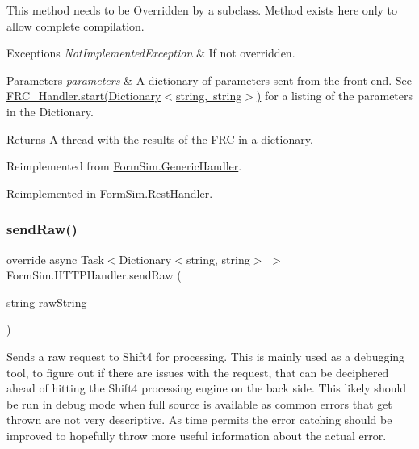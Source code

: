 This method needs to be Overridden by a subclass. Method exists here only to allow complete compilation. 


\begin{DoxyExceptions}{Exceptions}
{\em Not\+Implemented\+Exception} & If not overridden.\\
\hline
\end{DoxyExceptions}

\begin{DoxyParams}{Parameters}
{\em parameters} & A dictionary of parameters sent from the front end. See \mbox{\hyperlink{interface_form_sim_1_1_f_r_c___handler_a2a2a8a776e774e5f8b5e2b7e623a26a6}{F\+R\+C\+\_\+\+Handler.\+start(\+Dictionary$<$string, string$>$)}} for a listing of the parameters in the Dictionary.\\
\hline
\end{DoxyParams}
\begin{DoxyReturn}{Returns}
A thread with the results of the F\+RC in a dictionary.
\end{DoxyReturn}


Reimplemented from \mbox{\hyperlink{class_form_sim_1_1_generic_handler_a824697e5c22a4f1cf8ce4e512b6954ad}{Form\+Sim.\+Generic\+Handler}}.



Reimplemented in \mbox{\hyperlink{class_form_sim_1_1_rest_handler_aaba7a1239d5e4e2eb63e0f24f76341d1}{Form\+Sim.\+Rest\+Handler}}.

\mbox{\label{class_form_sim_1_1_h_t_t_p_handler_a31006e646afd7cb331784dce27760d5b}} 
\subsubsection{\texorpdfstring{send\+Raw()}{sendRaw()}}
{\footnotesize\ttfamily override async Task$<$Dictionary$<$string, string$>$ $>$ Form\+Sim.\+H\+T\+T\+P\+Handler.\+send\+Raw (\begin{DoxyParamCaption}\item[{string}]{raw\+String }\end{DoxyParamCaption})\hspace{0.3cm}{\ttfamily [inline]}}



Sends a raw request to Shift4 for processing. This is mainly used as a debugging tool, to figure out if there are issues with the request, that can be deciphered ahead of hitting the Shift4 processing engine on the back side. This likely should be run in debug mode when full source is available as common errors that get thrown are not very descriptive. As time permits the error catching should be improved to hopefully throw more useful information about the actual error. 


